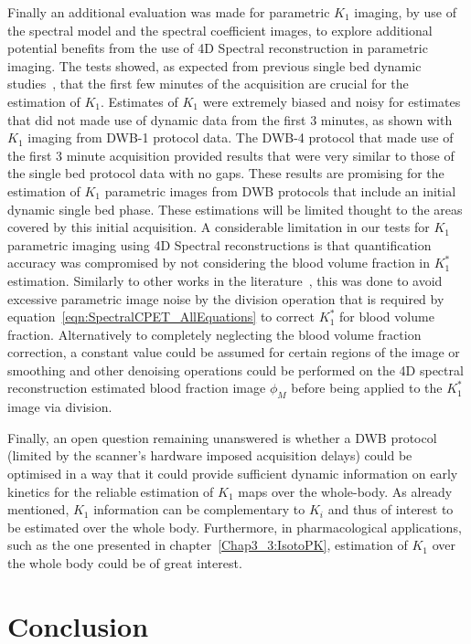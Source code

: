 Finally an additional evaluation was made for parametric $K_1$ imaging, by use of the spectral model and the spectral coefficient images, to explore additional potential benefits from the use of 4D Spectral reconstruction in parametric imaging. The tests showed, as expected from previous single bed dynamic studies~\cite{Meikle1998}, that the first few minutes of the acquisition are crucial for the estimation of $K_1$. Estimates of $K_1$ were extremely biased and noisy for estimates that did not made use of dynamic data from the first 3 minutes, as shown with $K_1$ imaging from DWB-1 protocol data. The DWB-4 protocol that made use of the first 3 minute acquisition provided results that were very similar to those of the single bed protocol data with no gaps. These results are promising for the estimation of $K_1$ parametric images from DWB protocols that include an initial dynamic single bed phase. These estimations will be limited thought to the areas covered by this initial acquisition.
A considerable limitation in our tests for $K_1$ parametric imaging using 4D Spectral reconstructions is that quantification accuracy was compromised by not considering the blood volume fraction in $K_1^*$ estimation. Similarly to other works in the literature~\cite{Feng2021}, this was done to avoid excessive parametric image noise by the division operation that is required by equation~\ref{eqn:SpectralCPET_AllEquations} to correct $K_1^*$ for blood volume fraction. 
Alternatively to completely neglecting the blood volume fraction correction, a constant value could be assumed for certain regions of the image or smoothing and other denoising operations could be performed on the 4D spectral reconstruction estimated blood fraction image $\phi_M$ before being applied to the $K_1^*$ image via division.

Finally, an open question remaining unanswered is whether a DWB protocol (limited by the scanner's hardware imposed acquisition delays) could be optimised in a way that it could provide sufficient dynamic information on early kinetics for the reliable estimation of $K_1$ maps over the whole-body. As already mentioned, $K_1$ information can be complementary to $K_i$ and thus of interest to be estimated over the whole body. Furthermore, in pharmacological applications, such as the one presented in chapter~\ref{Chap3_3:IsotoPK}, estimation of $K_1$ over the whole body could be of great interest.

\section{Conclusion}

